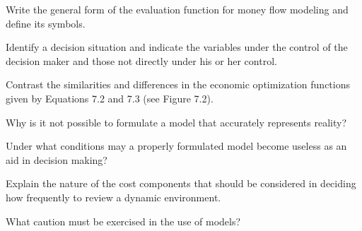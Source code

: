 \begin{exercises}
    \begin{exercise}
    \label{sea-7-8}
        Write the general form of the evaluation function for money flow modeling and define its symbols.
    \end{exercise}
    \begin{solution}
    \end{solution}
    
    \begin{exercise}
    \label{sea-7-9}
        Identify a decision situation and indicate the variables under the control of the decision maker and those not directly under his or her control.
    \end{exercise}
    \begin{solution}
    \end{solution}
    
    \begin{exercise}
    \label{sea-7-10}
        Contrast the similarities and differences in the economic optimization functions given by Equations 7.2 and 7.3 (see Figure 7.2).
    \end{exercise}
    \begin{solution}
    \end{solution}
    
    \begin{exercise}
    \label{sea-7-11}
        Why is it not possible to formulate a model that accurately represents reality?
    \end{exercise}
    \begin{solution}
    \end{solution}
    
    \begin{exercise}
    \label{sea-7-12}
        Under what conditions may a properly formulated model become useless as an aid in decision making?
    \end{exercise}
    \begin{solution}
    \end{solution}
    
    \begin{exercise}
    \label{sea-7-13}
        Explain the nature of the cost components that should be considered in deciding how frequently to review a dynamic environment.
    \end{exercise}
    \begin{solution}
    \end{solution}
    
    \begin{exercise}
    \label{sea-7-14}
        What caution must be exercised in the use of models?
    \end{exercise}
    \begin{solution}
    \end{solution}
    

\end{exercises}
